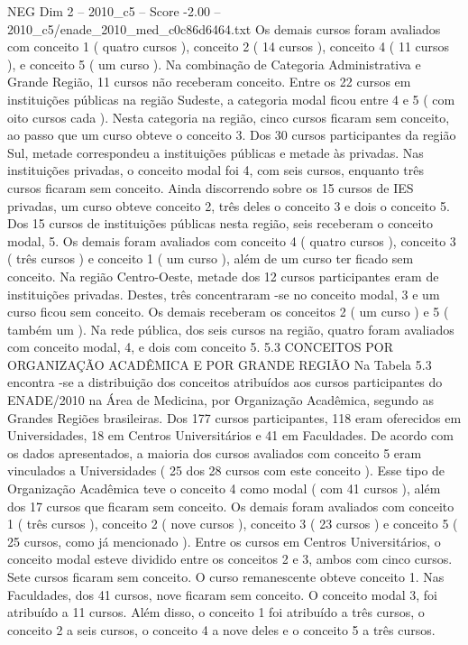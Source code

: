\begin{textsample}{NEG Dim 2 – 2010\_c5 – Score -2.00 – 2010\_c5/enade\_2010\_med\_c0c86d6464.txt}
Os demais cursos foram avaliados com conceito 1 ( quatro cursos ), conceito 2 ( 14 cursos ), conceito 4 ( 11 cursos ), e conceito 5 ( um curso ).
Na combinação de Categoria Administrativa e Grande Região, 11 cursos não receberam conceito.
Entre os 22 cursos em instituições públicas na região Sudeste, a categoria modal ficou entre 4 e 5 ( com oito cursos cada ).
Nesta categoria na região, cinco cursos ficaram sem conceito, ao passo que um curso obteve o conceito 3.
Dos 30 cursos participantes da região Sul, metade correspondeu a instituições públicas e metade às privadas.
Nas instituições privadas, o conceito modal foi 4, com seis cursos, enquanto três cursos ficaram sem conceito.
Ainda discorrendo sobre os 15 cursos de IES privadas, um curso obteve conceito 2, três deles o conceito 3 e dois o conceito 5.
Dos 15 cursos de instituições públicas nesta região, seis receberam o conceito modal, 5.
Os demais foram avaliados com conceito 4 ( quatro cursos ), conceito 3 ( três cursos ) e conceito 1 ( um curso ), além de um curso ter ficado sem conceito.
Na região Centro-Oeste, metade dos 12 cursos participantes eram de instituições privadas.
Destes, três concentraram -se no conceito modal, 3 e um curso ficou sem conceito.
Os demais receberam os conceitos 2 ( um curso ) e 5 ( também um ).
Na rede pública, dos seis cursos na região, quatro foram avaliados com conceito modal, 4, e dois com conceito 5. 5.3 CONCEITOS POR ORGANIZAÇÃO ACADÊMICA E POR GRANDE REGIÃO Na Tabela 5.3 encontra -se a distribuição dos conceitos atribuídos aos cursos participantes do ENADE/2010 na Área de Medicina, por Organização Acadêmica, segundo as Grandes Regiões brasileiras.
Dos 177 cursos participantes, 118 eram oferecidos em Universidades, 18 em Centros Universitários e 41 em Faculdades.
De acordo com os dados apresentados, a maioria dos cursos avaliados com conceito 5 eram vinculados a Universidades ( 25 dos 28 cursos com este conceito ).
Esse tipo de Organização Acadêmica teve o conceito 4 como modal ( com 41 cursos ), além dos 17 cursos que ficaram sem conceito.
Os demais foram avaliados com conceito 1 ( três cursos ), conceito 2 ( nove cursos ), conceito 3 ( 23 cursos ) e conceito 5 ( 25 cursos, como já mencionado ).
Entre os cursos em Centros Universitários, o conceito modal esteve dividido entre os conceitos 2 e 3, ambos com cinco cursos.
Sete cursos ficaram sem conceito.
O curso remanescente obteve conceito 1.
Nas Faculdades, dos 41 cursos, nove ficaram sem conceito.
O conceito modal 3, foi atribuído a 11 cursos.
Além disso, o conceito 1 foi atribuído a três cursos, o conceito 2 a seis cursos, o conceito 4 a nove deles e o conceito 5 a três cursos.

\end{textsample}
